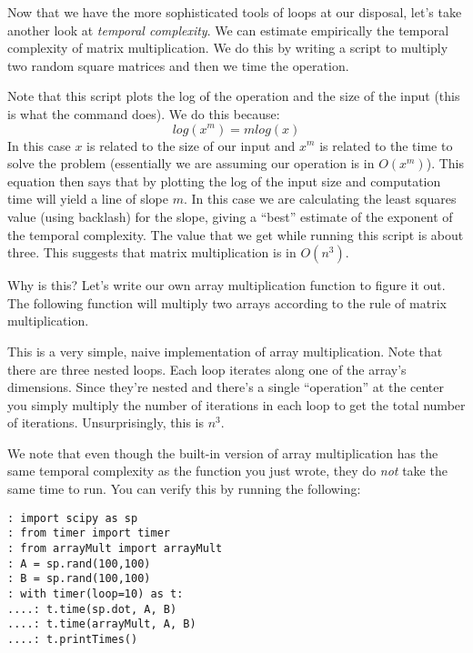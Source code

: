 

Now that we have the more sophisticated tools of loops at our disposal, let's take another look at \emph{temporal complexity}. We can estimate empirically the temporal complexity of matrix multiplication. We do this by writing a script to multiply two random square matrices and then we time the operation.


Note that this script plots the log of the operation and the size of the input (this is what the command  does). We do this because:
\[
log(x^m) = m log(x)
\]
In this case $x$ is related to the size of our input and $x^m$ is related to the time to solve the problem (essentially we are assuming our operation is in $O(x^m)$). This equation then says that by plotting the log of the input size and computation time will yield a line of slope $m$.
In this case we are calculating the least squares value (using backlash) for the slope, giving a ``best'' estimate of the exponent of the temporal complexity. The value that we get while running this script is about three. This suggests that matrix multiplication is in $O(n^3)$.

Why is this? Let's write our own array multiplication function to figure it out. The following function will multiply two arrays according to the rule of matrix multiplication.

 

This is a very simple, naive implementation of array multiplication. Note that there are three nested  loops. Each loop iterates along one of the array's dimensions. Since they're nested and there's a single ``operation'' at the center you simply multiply the number of iterations in each loop to get the total number of iterations. Unsurprisingly, this is $n^3$.

We note that even though the built-in version of array multiplication has the same temporal complexity as the function you just wrote, they do \emph{not} take the same time to run. You can verify this by running the following:
\begin{lstlisting}
: import scipy as sp
: from timer import timer
: from arrayMult import arrayMult
: A = sp.rand(100,100)
: B = sp.rand(100,100)
: with timer(loop=10) as t:
....: t.time(sp.dot, A, B)
....: t.time(arrayMult, A, B)
....: t.printTimes()
\end{lstlisting}

